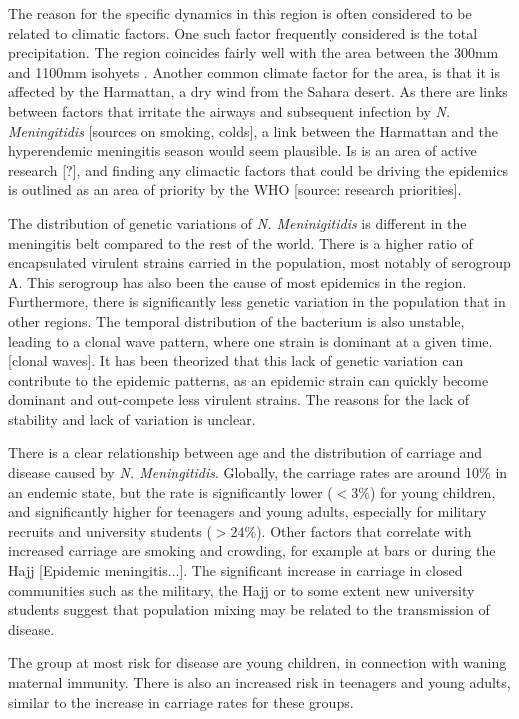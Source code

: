 \documentclass[10pt,a4paper]{article}
\begin{document}
The reason for the specific dynamics in this region is often considered to be related to climatic factors. One such factor frequently considered is the total precipitation. The region coincides fairly well with the area between the 300mm and 1100mm isohyets \cite{molesworth2002meningitis}. Another common climate factor for the area, is that it is affected by the Harmattan, a dry wind from the Sahara desert. As there are links between factors that irritate the airways and subsequent infection by \emph{N. Meningitidis} [sources on smoking, colds], a link between the Harmattan and the hyperendemic meningitis season would seem plausible. Is is an area of active research [?], and finding any climactic factors that could be driving the epidemics is outlined as an area of priority by the WHO [source: research priorities].

The distribution of genetic variations of \emph{N. Meninigitidis} is different in the meningitis belt compared to the rest of the world. There is a higher ratio of encapsulated virulent strains carried in the population, most notably of serogroup A. This serogroup has also been the cause of most epidemics in the region. Furthermore, there is significantly less genetic variation in the population that in other regions. The temporal distribution of the bacterium is also unstable, leading to a clonal wave pattern, where one strain is dominant at a given time. [clonal waves]. It has been theorized that this lack of genetic variation can contribute to the epidemic patterns, as an epidemic strain can quickly become dominant and out-compete less virulent strains. The reasons for the lack of stability and lack of variation is unclear.

There is a clear relationship between age and the distribution of carriage and disease caused by \emph{N. Meningitidis}. Globally, the carriage rates are around 10\% in an endemic state, but the rate is significantly lower ($<3\%$) for young children, and significantly higher for teenagers and young adults, especially for military recruits and university students ($>24\%$). Other factors that correlate with increased carriage are smoking and crowding, for example at bars or during the Hajj [Epidemic meningitis...]. The significant increase in carriage in closed communities such as the military, the Hajj or to some extent new university students suggest that population mixing may be related to the transmission of disease.

The group at most risk for disease are young children, in connection with waning maternal immunity. There is also an increased risk in teenagers and young adults, similar to the increase in carriage rates for these groups.
\end{document}
